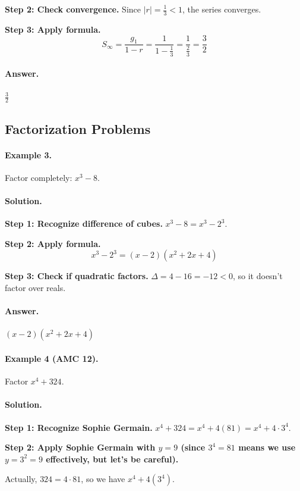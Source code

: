\documentclass[12pt]{extarticle}
\begin{document}
\textbf{Step 2: Check convergence.} Since $|r| = \frac{1}{3} < 1$, the series converges.

\textbf{Step 3: Apply formula.}
\[
S_\infty = \frac{g_1}{1-r} = \frac{1}{1-\frac{1}{3}} = \frac{1}{\frac{2}{3}} = \frac{3}{2}
\]

\paragraph{Answer.} $\boxed{\frac{3}{2}}$

\subsection{Factorization Problems}

\paragraph{Example 3.} Factor completely: $x^3 - 8$.

\paragraph{Solution.}
\textbf{Step 1: Recognize difference of cubes.} $x^3 - 8 = x^3 - 2^3$.

\textbf{Step 2: Apply formula.}
\[
x^3 - 2^3 = (x-2)(x^2 + 2x + 4)
\]

\textbf{Step 3: Check if quadratic factors.} $\Delta = 4 - 16 = -12 < 0$, so it doesn't factor over reals.

\paragraph{Answer.} $\boxed{(x-2)(x^2+2x+4)}$

\paragraph{Example 4 (AMC 12).} Factor $x^4 + 324$.

\paragraph{Solution.}
\textbf{Step 1: Recognize Sophie Germain.} $x^4 + 324 = x^4 + 4(81) = x^4 + 4 \cdot 3^4$.

\textbf{Step 2: Apply Sophie Germain with $y = 9$ (since $3^4 = 81$ means we use $y=3^2=9$ effectively, but let's be careful).}

Actually, $324 = 4 \cdot 81$, so we have $x^4 + 4(3^4)$.
\end{document}
